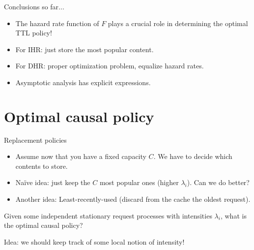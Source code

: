 \documentclass[aspectratio=169]{beamer}
\newenvironment*{myitem}[1][1.5em]{\begin{itemize}\setlength{\itemsep}{#1}}{\end{itemize}}
\begin{document}
  






\begin{frame}{Conclusions so far...}
	
	\begin{myitem}[2em]
		\item The \alert{hazard rate function} of $F$ plays a crucial role in determining the optimal TTL policy!
		\item For IHR: just store the most popular content.
		\item For DHR: proper optimization problem, \alert{equalize hazard rates}.
		\item Asymptotic analysis has \alert{explicit expressions}.
	\end{myitem}
\end{frame}


\section{Optimal causal policy}

\begin{frame}{Replacement policies}
	
	\begin{myitem}
		\item Assume now that you have a \alert{fixed} capacity $C$. We have to decide which contents to store.
		\item Naïve idea: just keep the $C$ most popular ones (higher $\lambda_i$). Can we do better?
		\item Another idea: Least-recently-used (discard from the cache the oldest request).
	\end{myitem}

	\vfill

	\pause
	\begin{problem}
		Given some independent stationary request processes with intensities $\lambda_i$, what is the \alert{optimal causal policy}?
	\end{problem}

	\vfill

	\alert{Idea:} we should keep track of some \alert{local notion} of intensity!
\end{frame}
\end{document}
